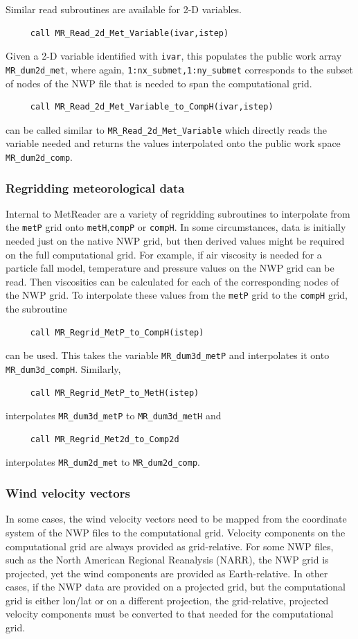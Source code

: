 \documentclass[11pt]{article}   %
\begin{document}
Similar read subroutines are available for 2-D variables.
\begin{verbatim}
     call MR_Read_2d_Met_Variable(ivar,istep)
\end{verbatim}
Given a 2-D variable identified with \texttt{ivar}, this populates the public
work array \texttt{MR\_dum2d\_met}, where again,
\texttt{1:nx\_submet,1:ny\_submet} corresponds to the subset of nodes of the NWP
file that is needed to span the computational grid.
\begin{verbatim}
     call MR_Read_2d_Met_Variable_to_CompH(ivar,istep)
\end{verbatim}
can be called similar to \texttt{MR\_Read\_2d\_Met\_Variable} which directly reads the
variable needed and returns the
values interpolated onto the public work space \texttt{MR\_dum2d\_comp}.

\subsubsection{Regridding meteorological data}
Internal to MetReader are a variety of regridding subroutines to interpolate from
the \texttt{metP} grid onto \texttt{metH},\texttt{compP} or \texttt{compH}.  
In some circumstances, data is initially needed just on the native NWP grid, but
then derived values might be required on the full computational grid.
For example, if air viscosity is needed for a particle fall model, temperature and
pressure values on the NWP grid can be read.  Then viscosities can be calculated for each
of the corresponding nodes of the NWP grid.  To interpolate these values from the 
\texttt{metP} grid to the \texttt{compH} grid, the subroutine
\begin{verbatim}
     call MR_Regrid_MetP_to_CompH(istep)
\end{verbatim}
can be used.  This takes the variable \texttt{MR\_dum3d\_metP} and interpolates it
onto \texttt{MR\_dum3d\_compH}.  Similarly, 
\begin{verbatim}
     call MR_Regrid_MetP_to_MetH(istep)
\end{verbatim}
interpolates \texttt{MR\_dum3d\_metP} to \texttt{MR\_dum3d\_metH} and 
\begin{verbatim}
     call MR_Regrid_Met2d_to_Comp2d
\end{verbatim}
interpolates \texttt{MR\_dum2d\_met} to \texttt{MR\_dum2d\_comp}.


\subsubsection{Wind velocity vectors}
In some cases, the wind velocity vectors need to be mapped from the coordinate
system of the NWP files to the computational grid.  Velocity components on the
computational grid are always provided as grid-relative.  For some NWP files, such
as the North American Regional Reanalysis (NARR), the NWP grid is projected, yet
the wind components are provided as Earth-relative.  In other cases, if the NWP
data are provided on a projected grid, but the computational grid is either lon/lat
or on a different projection, the grid-relative, projected velocity components must
be converted to that needed for the computational grid.
\end{document}
